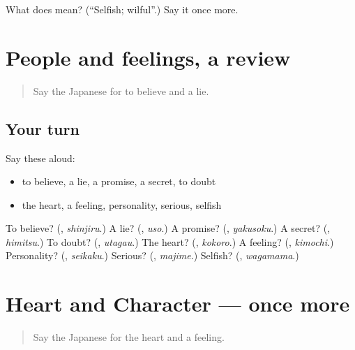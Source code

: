 \begin{tcolorbox}[breakable,colback=teal!4,colframe=teal!35!black,title={Before you move on}]
What does  mean? (\textquotedblleft{}Selfish; wilful\textquotedblright{}.) Say it once more.
\end{tcolorbox}
\section[(dialogue)]{People and feelings, a review}

\label{lesson:JA-R249-review-248-249}



\begin{quote}
Say the Japanese for to believe and a lie.
\end{quote}

\subsection*{Your turn}
Say these aloud:

\begin{itemize}
\raggedright
  \item to believe, a lie, a promise, a secret, to doubt
  \item the heart, a feeling, personality, serious, selfish
\end{itemize}

\begin{tcolorbox}[breakable,colback=teal!4,colframe=teal!35!black,title={Before you move on}]
To believe? (\textbf{}, \emph{shinjiru}.) A lie? (\textbf{}, \emph{uso}.) A promise? (\textbf{}, \emph{yakusoku}.) A secret? (\textbf{}, \emph{himitsu}.) To doubt? (\textbf{}, \emph{utagau}.) The heart? (\textbf{}, \emph{kokoro}.) A feeling? (\textbf{}, \emph{kimochi}.) Personality? (\textbf{}, \emph{seikaku}.) Serious? (\textbf{}, \emph{majime}.) Selfish? (\textbf{}, \emph{wagamama}.)
\end{tcolorbox}
\section[(dialogue)]{Heart and Character — once more}

\label{lesson:JA-R249-review-final-249}



\begin{quote}
Say the Japanese for the heart and a feeling.
\end{quote}

